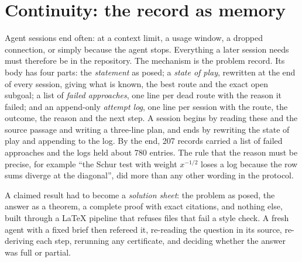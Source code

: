 \documentclass[11pt]{amsart}
\newcommand*{\sectionbreak}{\clearpage} %
\begin{document}
\sectionbreak
\section{Continuity: the record as memory}\label{sec:continuity}

Agent sessions end often: at a context limit, a usage window, a dropped
connection, or simply because the agent stops. Everything a later session needs
must therefore be in the repository. The mechanism is the problem record. Its
body has four parts: the \emph{statement} as posed; a \emph{state of play},
rewritten at the end of every session, giving what is known, the best route and
the exact open subgoal; a list of \emph{failed approaches}, one line per dead
route with the reason it failed; and an append-only \emph{attempt log}, one
line per session with the route, the outcome, the reason and the next step. A
session begins by reading these and the source passage and writing a three-line
plan, and ends by rewriting the state of play and appending to the log. By the
end, 207 records carried a list of failed approaches and the logs held about
780 entries. The rule that the reason must be precise, for example ``the Schur
test with weight $x^{-1/2}$ loses a log because the row sums diverge at the
diagonal'', did more than any other wording in the protocol.

A claimed result had to become a \emph{solution sheet}: the problem as posed,
the answer as a theorem, a complete proof with exact citations, and nothing
else, built through a LaTeX pipeline that refuses files that fail a style
check. A fresh agent with a fixed brief then refereed it, re-reading the
question in its source, re-deriving each step, rerunning any certificate, and
deciding whether the answer was full or partial.
\end{document}
